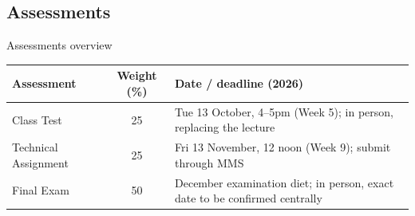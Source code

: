 \documentclass[9pt,aspectratio=169]{beamer}
\begin{document}
\subsection{Assessments}

\begin{frame}{Assessments overview}
\renewcommand{\arraystretch}{1.5}
\begin{table}[h!]
\centering
\begin{tabularx}{\textwidth}{l c X}
\hline
\textbf{Assessment} & \textbf{Weight (\%)} & \textbf{Date / deadline (2026)} \\
\hline
Class Test & 25 & Tue 13 October, 4--5pm (Week 5); in person, replacing the lecture \\
Technical Assignment & 25 & Fri 13 November, 12 noon (Week 9); submit through MMS \\
Final Exam & 50 & December examination diet; in person, exact date to be confirmed centrally \\
\hline
\end{tabularx}
\end{table}
\end{frame}
\end{document}
